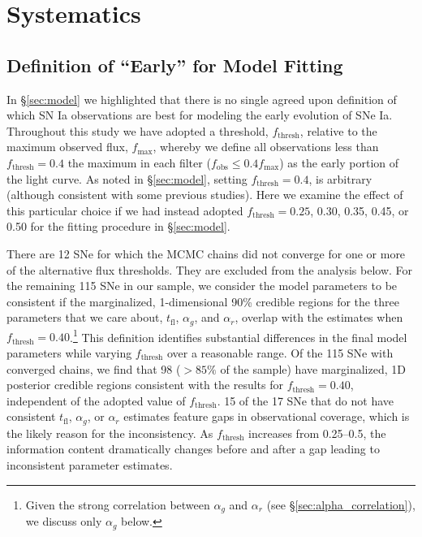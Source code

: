 \documentclass[twocolumn]{./aastex63}
\newcommand{\tfl}{$t_\mathrm{fl}$}
\begin{document}
\section{Systematics}\label{sec:systematics}

\subsection{Definition of ``Early'' for Model Fitting}

In \S\ref{sec:model} we highlighted that there is no single agreed upon
definition of which SN Ia observations are best for modeling the early evolution
of SNe Ia. Throughout this study we have adopted a threshold,
$f_\mathrm{thresh}$, relative to the maximum observed flux, $f_\mathrm{max}$,
whereby we define all observations less than $f_\mathrm{thresh} = 0.4$ the
maximum in each filter ($f_\mathrm{obs} \leq 0.4f_\mathrm{max}$) as the early
portion of the light curve. As noted in \S\ref{sec:model}, setting
$f_\mathrm{thresh} = 0.4$, is arbitrary (although consistent with some previous
studies). Here we examine the effect of this particular choice if we had instead
adopted $f_\mathrm{thresh} = 0.25$, 0.30, 0.35, 0.45, or 0.50 for the fitting
procedure in \S\ref{sec:model}.

There are 12 SNe for which the MCMC chains did not converge for one or more of
the alternative flux thresholds. They are excluded from the analysis below. For
the remaining 115 SNe in our sample, we consider the model parameters to be
consistent if the marginalized, 1-dimensional 90\% credible regions for the
three parameters that we care about, \tfl, $\alpha_g$, and $\alpha_r$, overlap
with the estimates when $f_\mathrm{thresh} = 0.40$.\footnote{Given the strong
correlation between $\alpha_g$ and $\alpha_r$ (see
\S\ref{sec:alpha_correlation}), we discuss only $\alpha_g$ below.} This
definition identifies substantial differences in the final model parameters
while varying $f_\mathrm{thresh}$ over a reasonable range. Of the 115 SNe with
converged chains, we find that 98 ($> 85\%$ of the sample) have marginalized, 1D
posterior credible regions consistent with the results for $f_\mathrm{thresh} =
0.40$, independent of the adopted value of $f_\mathrm{thresh}$. 15 of the 17 SNe
that do not have consistent \tfl, $\alpha_g$, or $\alpha_r$ estimates feature
gaps in observational coverage, which is the likely reason for the
inconsistency. As $f_\mathrm{thresh}$ increases from 0.25--0.5, the information
content dramatically changes before and after a gap leading to inconsistent
parameter estimates.
\end{document}
